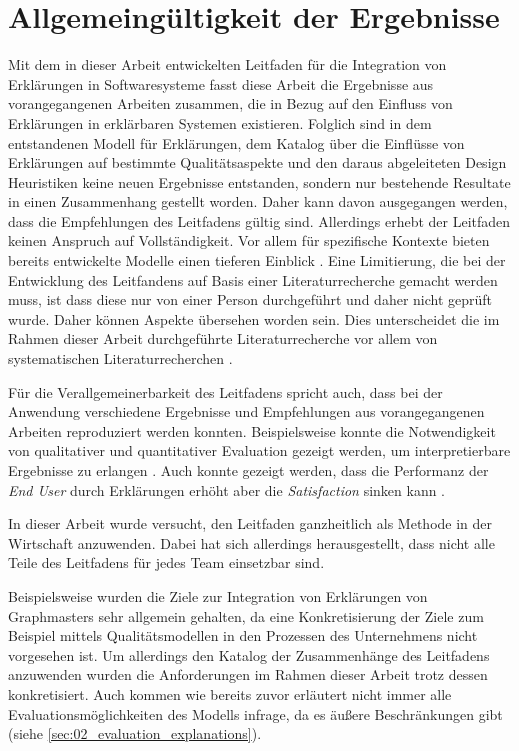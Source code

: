 \section{Allgemeingültigkeit der Ergebnisse}

Mit dem in dieser Arbeit entwickelten Leitfaden für die Integration von Erklärungen in Softwaresysteme fasst diese Arbeit die Ergebnisse aus vorangegangenen Arbeiten zusammen, die in Bezug auf den Einfluss von Erklärungen in erklärbaren Systemen existieren. Folglich sind in dem entstandenen Modell für Erklärungen, dem Katalog über die Einflüsse von Erklärungen auf bestimmte Qualitätsaspekte und den daraus abgeleiteten Design Heuristiken keine neuen Ergebnisse entstanden, sondern nur bestehende Resultate in einen Zusammenhang gestellt worden. Daher kann davon ausgegangen werden, dass die Empfehlungen des Leitfadens gültig sind. Allerdings erhebt der Leitfaden keinen Anspruch auf Vollständigkeit. Vor allem für spezifische Kontexte bieten bereits entwickelte Modelle einen tieferen Einblick \cite{nunes_systematic_2017, sokol_explainability_2020}. Eine Limitierung, die bei der Entwicklung des Leitfandens auf Basis einer Literaturrecherche gemacht werden muss, ist dass diese nur von einer Person durchgeführt und daher nicht geprüft wurde. Daher können Aspekte übersehen worden sein. Dies unterscheidet die im Rahmen dieser Arbeit durchgeführte Literaturrecherche vor allem von systematischen Literaturrecherchen \cite[vgl.][]{nunes_systematic_2017,chazette_knowledge_nodate}.

Für die Verallgemeinerbarkeit des Leitfadens spricht auch, dass bei der Anwendung verschiedene Ergebnisse und Empfehlungen aus vorangegangenen Arbeiten reproduziert werden konnten. Beispielsweise konnte die Notwendigkeit von qualitativer und quantitativer Evaluation gezeigt werden, um interpretierbare Ergebnisse zu erlangen \cite{}. Auch konnte gezeigt werden, dass die Performanz der \textit{End User} durch Erklärungen erhöht aber die \textit{Satisfaction} sinken kann \cite{}. 

\smallskip

In dieser Arbeit wurde versucht, den Leitfaden ganzheitlich als Methode in der Wirtschaft anzuwenden. Dabei hat sich allerdings herausgestellt, dass nicht alle Teile des Leitfadens für jedes Team einsetzbar sind.

Beispielsweise wurden die Ziele zur Integration von Erklärungen von Graphmasters sehr allgemein gehalten, da eine Konkretisierung der Ziele zum Beispiel mittels Qualitätsmodellen \cite{schneider2012abenteuer} in den Prozessen des Unternehmens nicht vorgesehen ist. Um allerdings den Katalog der Zusammenhänge des Leitfadens anzuwenden wurden die Anforderungen im Rahmen dieser Arbeit trotz dessen konkretisiert. Auch kommen wie bereits zuvor erläutert nicht immer alle Evaluationsmöglichkeiten des Modells infrage, da es äußere Beschränkungen gibt (siehe \autoref{sec:02_evaluation_explanations}).


